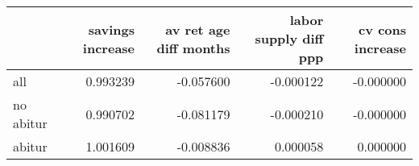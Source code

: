 \begin{tabular}{lrrrr}
\toprule
 & savings increase & av ret age diff months & labor supply diff ppp & cv cons increase \\
\midrule
all & 0.993239 & -0.057600 & -0.000122 & -0.000000 \\
no abitur & 0.990702 & -0.081179 & -0.000210 & -0.000000 \\
abitur & 1.001609 & -0.008836 & 0.000058 & 0.000000 \\
\bottomrule
\end{tabular}
